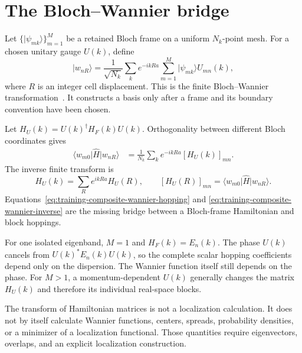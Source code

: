 \section{The Bloch--Wannier bridge}

Let $\{\lvert\psi_{m k}\rangle\}_{m=1}^{M}$ be a retained Bloch frame on a
uniform $N_k$-point mesh. For a chosen unitary gauge $U(k)$, define
\begin{equation}
  \lvert w_{nR}\rangle
  =\frac{1}{\sqrt{N_k}}
   \sum_k e^{-ikRa}
   \sum_{m=1}^{M}
   \lvert\psi_{mk}\rangle U_{mn}(k),
  \label{eq:training-composite-wannier-transform}
\end{equation}
where $R$ is an integer cell displacement. This is the finite
Bloch--Wannier transformation~\cite{wannier1937,marzari1997,marzari2012}.
It constructs a basis only after a frame and its boundary convention have been
chosen.

Let $H_U(k)=U(k)^{\dagger}H_F(k)U(k)$. Orthogonality between different Bloch
coordinates gives
\begin{align}
  \langle w_{m0}\rvert\widehat H\lvert w_{nR}\rangle
  &=\frac{1}{N_k}\sum_k
    e^{-ikRa}[H_U(k)]_{mn}.
  \label{eq:training-composite-wannier-hopping}
\end{align}
The inverse finite transform is
\begin{equation}
  H_U(k)
  =\sum_R e^{ikRa}H_U(R),
  \qquad
  [H_U(R)]_{mn}
  =\langle w_{m0}\rvert\widehat H\lvert w_{nR}\rangle.
  \label{eq:training-composite-wannier-inverse}
\end{equation}
Equations~\eqref{eq:training-composite-wannier-hopping} and
\eqref{eq:training-composite-wannier-inverse} are the missing bridge between a
Bloch-frame Hamiltonian and block hoppings.

For one isolated eigenband, $M=1$ and $H_F(k)=E_n(k)$. The phase $U(k)$ cancels
from $U(k)^*E_n(k)U(k)$, so the complete scalar hopping coefficients depend only
on the dispersion. The Wannier function itself still depends on the phase. For
$M>1$, a momentum-dependent $U(k)$ generally changes the matrix
$H_U(k)$ and therefore its individual real-space blocks.

The transform of Hamiltonian matrices is not a localization calculation. It
does not by itself calculate Wannier functions, centers, spreads, probability
densities, or a minimizer of a localization functional. Those quantities
require eigenvectors, overlaps, and an explicit localization construction.

